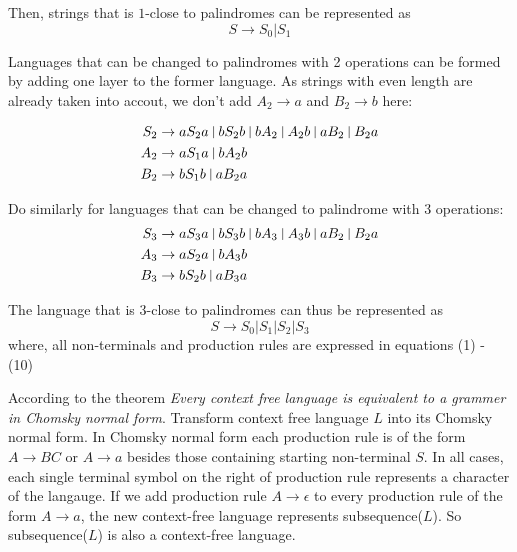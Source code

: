 \documentclass[12pt,a4paper]{article}
\newcommand{\question}[1]{\bigskip\noindent{\textbf{Q{#1} solution}}}
\begin{document}
Then, strings that is $1$-close to palindromes can be represented as  
$$
  S \rightarrow S_0 | S_1
$$

Languages that can be changed to palindromes with 2 operations can be formed by adding one layer to the former language. As strings with even length are already taken into accout, we don't add $A_2\rightarrow a$ and $B_2\rightarrow b$ here:

\begin{align}
  S_2 & \rightarrow aS_2a\ \vline\ bS_2b\ \vline\ bA_2\ \vline\ A_2b\  \vline\ aB_2\ \vline\ B_2a \\
  A_2 &\rightarrow aS_1a\ \vline\ bA_2b \\
  B_2 &\rightarrow bS_1b\ \vline\ aB_2a
\end{align}

Do similarly for languages that can be changed to palindrome with 3 operations:
\begin{align}
  S_3 & \rightarrow aS_3a\ \vline\ bS_3b\ \vline\ bA_3\ \vline\ A_3b\  \vline\ aB_2\ \vline\ B_2a \\
  A_3 &\rightarrow aS_2a\ \vline\ bA_3b \\
  B_3 &\rightarrow bS_2b\ \vline\ aB_3a
\end{align}

The language that is 3-close to palindromes can thus be represented as
$$
  S \rightarrow S_0 | S_1 | S_2 | S_3
$$
where, all non-terminals and production rules are expressed in equations (1) - (10)







\question{12.B}

According to the theorem {\em Every context free language is equivalent to a grammer in Chomsky normal form}\cite{model}. Transform context free language $L$ into its Chomsky normal form. In Chomsky normal form each production rule is of the form $A\rightarrow BC \mbox{ or } A\rightarrow a$ besides those containing starting non-terminal $S$. In all cases, each single terminal symbol on the right of production rule represents a character of the langauge. If we add production rule $A\rightarrow \epsilon$ to every production rule of the form $A\rightarrow a$, the new context-free language represents subsequence($L$). So subsequence($L$) is also a context-free language.




\end{document}
